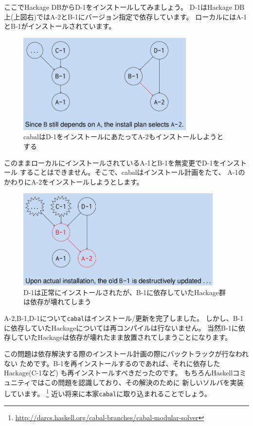 \documentclass[mingoth,a4paper]{jsarticle}
\begin{document}
ここでHackage DBからD-1をインストールしてみましょう。
D-1はHackage DB上(上図右)ではA-2とB-1にバージョン指定で依存しています。
ローカルにはA-1とB-1がインストールされています。

\begin{figure}[ht]
  \begin{center}
    \includegraphics[height=5cm]{image201110/cabal-5.png}
  \end{center}
  \label{fig:cabal-5}\caption{cabalはD-1をインストールにあたってA-2もインストールしようとする}
\end{figure}

このままローカルにインストールされているA-1とB-1を無変更でD-1をインストール
することはできません。そこで、cabalはインストール計画をたて、
A-1のかわりにA-2をインストールしようとします。

\begin{figure}[ht]
  \begin{center}
    \includegraphics[height=5cm]{image201110/cabal-6.png}
  \end{center}
  \label{fig:cabal-6}\caption{D-1は正常にインストールされたが、B-1に依存していたHackage群は依存が壊れてしまう}
\end{figure}

A-2,B-1,D-1について\texttt{cabal}はインストール/更新を完了しました。
しかし、B-1に依存していたHackageについては再コンパイルは行ないません。
当然B-1に依存していたHackageは依存が壊れたまま放置されてしまうことになります。


この問題は依存解決する際のインストール計画の際にバックトラックが行なわれない
ためです。B-1を再インストールするのであれば、それに依存したHackage(C-1など)
も再インストールすべきだったのです。
もちろんHaskellコミュニティではこの問題を認識しており、その解決のために
新しいソルバを実装しています。
\footnote{\url{http://darcs.haskell.org/cabal-branches/cabal-modular-solver}}
近い将来に本家\texttt{cabal}に取り込まれることでしょう。
\end{document}
